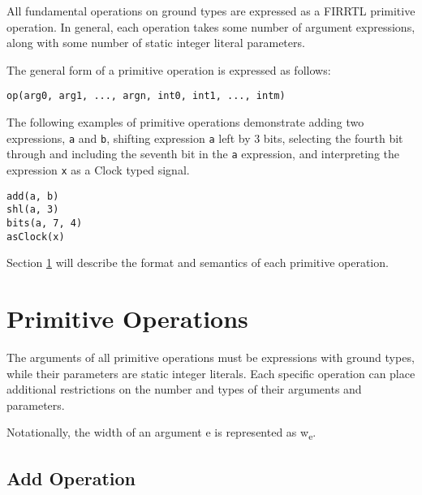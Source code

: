\documentclass[12pt]{article}
\begin{document}
All fundamental operations on ground types are expressed as a FIRRTL primitive operation. In general, each operation takes some number of argument expressions, along with some number of static integer literal parameters.

The general form of a primitive operation is expressed as follows:
\begin{lstlisting}
op(arg0, arg1, ..., argn, int0, int1, ..., intm)
\end{lstlisting}

The following examples of primitive operations demonstrate adding two expressions, \verb|a| and \verb|b|, shifting expression \verb|a| left by 3 bits, selecting the fourth bit through and including the seventh bit in the \verb|a| expression, and interpreting the expression \verb|x| as a Clock typed signal.
\begin{lstlisting}
add(a, b)
shl(a, 3)
bits(a, 7, 4)
asClock(x)
\end{lstlisting}

Section \ref{primitives} will describe the format and semantics of each primitive operation.

\section{Primitive Operations} \label{primitives}

\newcommand{\vv}[1]{{\ttfamily #1}}
\newcommand{\ts}[1]{\textsubscript{#1}}
\newcommand{\nf}[1]{\normalfont{\textbf{#1}}}
\newcommand{\nit}[1]{\normalfont{\textit{#1}}}
\newcommand{\mrow}[2]{\multirow{#1}{*}{#2}}
\newcommand{\mcol}[3]{\multicolumn{#1}{#2}{#3}}
\newcommand{\opheader}{
  \hline
  \mrow{2}{\nf{Name}} & \mrow{2}{\nf{Arguments}} & \mrow{2}{\nf{Parameters}} & \mrow{2}{\nf{Arg Types}} & \multicolumn{2}{c|}{\nf{Result}} \\
                      &                          &                           &                          & \mcol{1}{c}{\nit{Type}} & \mcol{1}{c|}{\nit{Width}} \\
  \hline
}

The arguments of all primitive operations must be expressions with ground types, while their parameters are static integer literals. Each specific operation can place additional restrictions on the number and types of their arguments and parameters.

Notationally, the width of an argument \vv{e} is represented as \vv{w}\ts{e}.

\subsection{Add Operation}
\end{document}
